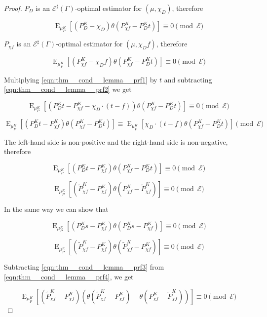 \documentclass{article}
\numberwithin{equation}{section}
\theoremstyle{definition}
\theoremstyle{plain}
\DeclareMathOperator{\E}{E}
\newcommand{\Fall}{\mathcal{E}}
\newcommand{\ESG}{\Fall^\sharp(\Gamma)}
\begin{document}
\begin{proof}

$P_D$ is an $\ESG$-optimal estimator for $(\mu, \chi_D)$, therefore

\begin{equation}
\label{eqn:thm__cond__lemma__prf1}
\E_{\mu_P^K}[(P_D^K- \chi_D) \theta(P_{\chi f}^K- P_D^K t)] \equiv 0 \pmod \Fall
\end{equation}

$P_{\chi f}$ is an $\ESG$-optimal estimator for $(\mu, \chi_D f)$, therefore

\begin{equation}
\label{eqn:thm__cond__lemma__prf2}
\E_{\mu_P^K}[(P_{\chi f}^K - \chi_D f) \theta(P_{\chi f}^K - P_D^K t)] \equiv 0 \pmod \Fall
\end{equation}

Multiplying \ref{eqn:thm__cond__lemma__prf1} by $t$ and subtracting \ref{eqn:thm__cond__lemma__prf2} we get

\[\E_{\mu_P^K}[(P_D^K t - P_{\chi f}^K - \chi_D \cdot (t - f)) \theta(P_{\chi f}^K- P_D^K t)] \equiv 0 \pmod \Fall\]

\[\E_{\mu_P^K}[(P_D^K t - P_{\chi f}^K ) \theta(P_{\chi f}^K- P_D^K t)] \equiv \E_{\mu_P^K}[\chi_D \cdot (t- f) \theta(P_{\chi f}^K- P_D^K t)] \pmod \Fall\]

The left-hand side is non-positive and the right-hand side is non-negative, therefore

\[\E_{\mu_P^K}[(P_D^K t - P_{\chi f}^K ) \theta(P_{\chi f}^K- P_D^K t)] \equiv 0 \pmod \Fall\]

\begin{equation}
\label{eqn:thm__cond__lemma__prf3}
\E_{\mu_P^K}[(\tilde{P}_{\chi f}^K - P_{\chi f}^K) \theta(P_{\chi f}^K - \tilde{P}_{\chi f}^K)] \equiv 0 \pmod \Fall
\end{equation}

In the same way we can show that

\[\E_{\mu_P^K}[(P_D^K s - P_{\chi f}^K) \theta(P_D^K s-P_{\chi f}^K)] \equiv 0 \pmod \Fall\]

\begin{equation}
\label{eqn:thm__cond__lemma__prf4}
\E_{\mu_P^K}[(\tilde{P}_{\chi f}^K - P_{\chi f}^K) \theta(\tilde{P}_{\chi f}^K-P_{\chi f}^K )] \equiv 0 \pmod \Fall
\end{equation}

Subtracting \ref{eqn:thm__cond__lemma__prf3} from \ref{eqn:thm__cond__lemma__prf4}, we get

\[\E_{\mu_P^K}[(\tilde{P}_{\chi f}^K - P_{\chi f}^K) (\theta(\tilde{P}_{\chi f}^K-P_{\chi f}^K)- \theta(P_{\chi f}^K - \tilde{P}_{\chi f}^K))] \equiv 0 \pmod \Fall\]


\end{proof}
\end{document}
